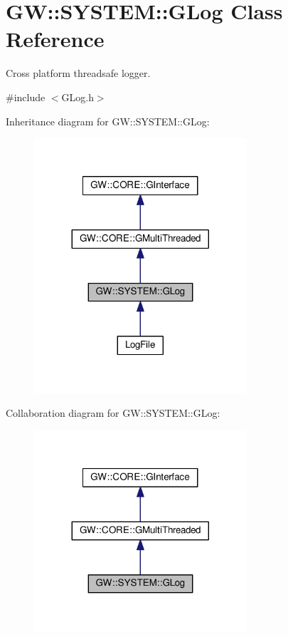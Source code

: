 \hypertarget{classGW_1_1SYSTEM_1_1GLog}{}\section{GW\+:\+:S\+Y\+S\+T\+EM\+:\+:G\+Log Class Reference}
\label{classGW_1_1SYSTEM_1_1GLog}


Cross platform threadsafe logger.  




{\ttfamily \#include $<$G\+Log.\+h$>$}



Inheritance diagram for GW\+:\+:S\+Y\+S\+T\+EM\+:\+:G\+Log\+:
\nopagebreak
\begin{figure}[H]
\begin{center}
\leavevmode
\includegraphics[width=224pt]{classGW_1_1SYSTEM_1_1GLog__inherit__graph}
\end{center}
\end{figure}


Collaboration diagram for GW\+:\+:S\+Y\+S\+T\+EM\+:\+:G\+Log\+:
\nopagebreak
\begin{figure}[H]
\begin{center}
\leavevmode
\includegraphics[width=224pt]{classGW_1_1SYSTEM_1_1GLog__coll__graph}
\end{center}
\end{figure}
